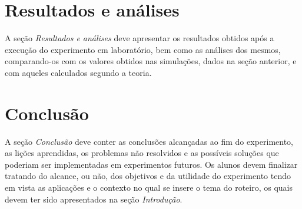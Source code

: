 \documentclass[10pt,twocolumn,letterpaper]{article}
\begin{document}
\section{Resultados e análises}

A seção {\em Resultados e análises} deve apresentar os resultados obtidos após a execução do experimento em laboratório, bem como as análises dos mesmos, comparando-os com os valores obtidos nas simulações, dados na seção anterior, e com aqueles calculados segundo a teoria.  

\section{Conclusão}

A seção {\em Conclusão} deve conter as conclusões alcançadas ao fim do experimento, as lições aprendidas, os problemas não resolvidos e as possíveis soluções que poderiam ser implementadas em experimentos futuros. Os alunos devem finalizar tratando do alcance, ou não, dos objetivos e da utilidade do experimento tendo em vista as aplicações e o contexto no qual se insere o tema do roteiro, os quais devem ter sido apresentados na seção {\em Introdução}.

{\small


}
\end{document}
